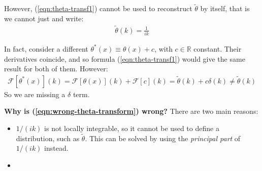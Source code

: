 \documentclass[../template.tex]{subfiles}
\begin{document}
However, (\ref{eqn:theta-transf1}) cannot be used to reconstruct $\tilde{\theta}$ by itself, that is we cannot just  and write:
\begin{align} \label{eqn:wrong-theta-transform}
    \tilde{\theta}(k) = \frac{1}{ik} 
\end{align}

In fact, consider a different $\theta^*(x) \equiv \theta(x) + c$, with $c \in \mathbb{R}$ constant. Their derivatives coincide, and so formula (\ref{eqn:theta-transf1}) would give the same result for both of them. However:
\begin{align*}
    \mathcal{F}[\theta^*(x)](k) = \mathcal{F}[\theta(x)](k) + \mathcal{F}[c](k) = \tilde{\theta}(k) + c \delta(k) \neq \tilde{\theta}(k)
\end{align*}
So we are missing a $\delta$ term.

\begin{expl}\textbf{Why is (\ref{eqn:wrong-theta-transform}) wrong?} There are two main reasons:
\begin{itemize}
    \item $1/(ik)$ is not locally integrable, so it cannot be used to define a distribution, such as $\tilde{\theta}$. This can be solved by using the \textit{principal part} of $1/(ik)$ instead. 
    \item %
\end{itemize}

     
    
\end{expl}



\end{document}
